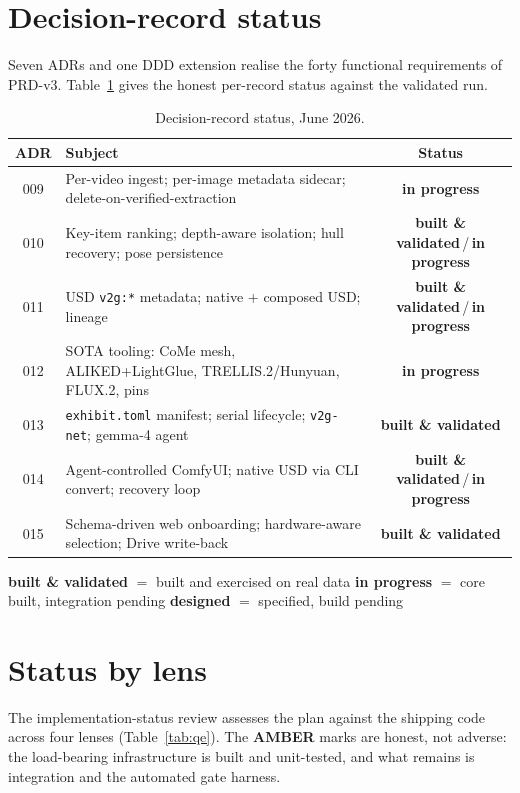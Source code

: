 \documentclass[a4paper,11pt]{report}
\newcommand{\chip}[2]{\textcolor{#1}{\textbf{#2}}}
\newcommand{\code}[1]{\texttt{#1}}
\newcommand{\validated}{\chip{SuccessGreen}{built \& validated}}
\newcommand{\wip}{\chip{WarningAmber}{in progress}}
\newcommand{\designed}{\chip{MidGrey}{designed}}
\newcommand{\amber}{\textcolor{WarningAmber}{\textbf{AMBER}}}
\begin{document}
\section{Decision-record status}
Seven ADRs and one DDD extension realise the forty functional requirements of PRD-v3.
Table~\ref{tab:adr} gives the honest per-record status against the validated run.

\begin{table}[h]
\centering\small
\caption{Decision-record status, June 2026.}\label{tab:adr}
\begin{tabularx}{\textwidth}{@{}c X c@{}}
\toprule
\textbf{ADR} & \textbf{Subject} & \textbf{Status} \\
\midrule
009 & Per-video ingest; per-image metadata sidecar; delete-on-verified-extraction & \wip{} \\
010 & Key-item ranking; depth-aware isolation; hull recovery; pose persistence & \validated{}\,/\,\wip{} \\
011 & USD \code{v2g:*} metadata; native + composed USD; lineage & \validated{}\,/\,\wip{} \\
012 & SOTA tooling: CoMe mesh, ALIKED+LightGlue, TRELLIS.2/Hunyuan, FLUX.2, pins & \wip{} \\
013 & \code{exhibit.toml} manifest; serial lifecycle; \code{v2g-net}; gemma-4 agent & \validated{} \\
014 & Agent-controlled ComfyUI; native USD via CLI convert; recovery loop & \validated{}\,/\,\wip{} \\
015 & Schema-driven web onboarding; hardware-aware selection; Drive write-back & \validated{} \\
\bottomrule
\end{tabularx}
\par\smallskip
{\footnotesize\textcolor{MidGrey}{\validated{} $=$ built and exercised on real data \quad \wip{} $=$ core
built, integration pending \quad \designed{} $=$ specified, build pending}}
\end{table}

\section{Status by lens}
The implementation-status review assesses the plan against the shipping code across four lenses
(Table~\ref{tab:qe}). The \amber{} marks are honest, not adverse: the load-bearing infrastructure is built
and unit-tested, and what remains is integration and the automated gate harness.
\end{document}
